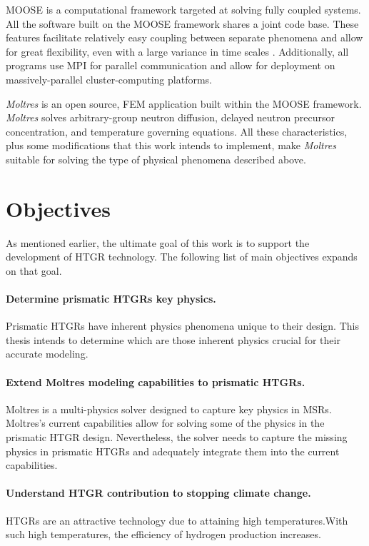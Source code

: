 \gls{MOOSE} \cite{gaston_moose_2009} is a computational framework targeted at solving fully coupled systems.
All the software built on the \gls{MOOSE} framework shares a joint code base.
These features facilitate relatively easy coupling between separate phenomena and allow for great flexibility, even with a large variance in time scales \cite{novak_pronghorn_2018}.
Additionally, all programs use \gls{MPI} for parallel communication and allow for deployment on massively-parallel cluster-computing platforms.

\textit{Moltres} is an open source, \gls{FEM} application built within the \gls{MOOSE} framework.
\textit{Moltres} solves arbitrary-group neutron diffusion, delayed neutron precursor concentration, and temperature governing equations.
All these characteristics, plus some modifications that this work intends to implement, make \textit{Moltres} suitable for solving the type of physical phenomena described above.

\section{Objectives}

As mentioned earlier, the ultimate goal of this work is to support the development of \gls{HTGR} technology.
The following list of main objectives expands on that goal.

\paragraph{Determine prismatic \glspl{HTGR} key physics.}
Prismatic HTGRs have inherent physics phenomena unique to their design.
This thesis intends to determine which are those inherent physics crucial for their accurate modeling.

\paragraph{Extend Moltres modeling capabilities to prismatic \glspl{HTGR}.}
Moltres is a multi-physics solver designed to capture key physics in \glspl{MSR}.
Moltres's current capabilities allow for solving some of the physics in the prismatic HTGR design.
Nevertheless, the solver needs to capture the missing physics in prismatic HTGRs and adequately integrate them into the current capabilities.

\paragraph{Understand \gls{HTGR} contribution to stopping climate change.}
HTGRs are an attractive technology due to attaining high temperatures.With such high temperatures, the efficiency of hydrogen production increases.

